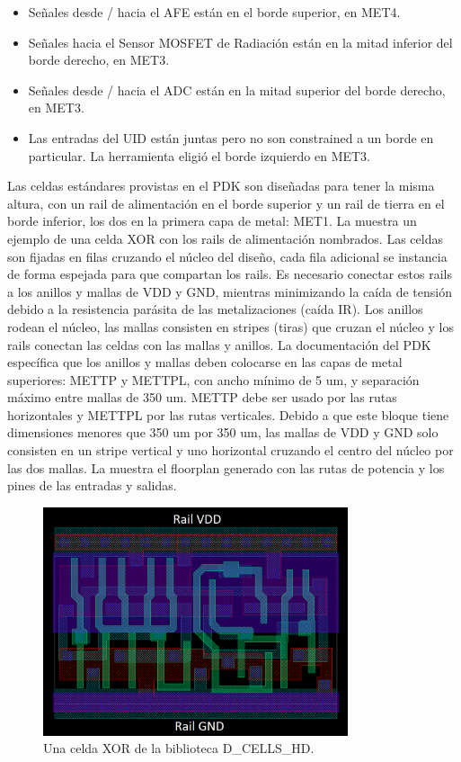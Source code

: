 \documentclass[a4paper, twoside, 11pt]{report}
\begin{document}
\begin{itemize}
  \item Señales desde / hacia el AFE están en el borde superior, en MET4.
  \item Señales hacia el Sensor MOSFET de Radiación están en la mitad inferior del borde derecho, en MET3.
  \item Señales desde / hacia el ADC están en la mitad superior del borde derecho, en MET3.
  \item Las entradas del UID están juntas pero no son constrained a un borde en particular. La herramienta eligió el borde izquierdo en MET3.
\end{itemize}

Las celdas estándares provistas en el PDK son diseñadas para tener la misma altura, con un rail de alimentación en el borde superior y un rail de tierra en el borde inferior, los dos en la primera capa de metal: MET1. La  muestra un ejemplo de una celda XOR con los rails de alimentación nombrados. Las celdas son fijadas en filas cruzando el núcleo del diseño, cada fila adicional se instancia de forma espejada para que compartan los rails. Es necesario conectar estos rails a los anillos y mallas de VDD y GND, mientras minimizando la caída de tensión debido a la resistencia parásita de las metalizaciones (caída IR). Los anillos rodean el núcleo, las mallas consisten en stripes (tiras) que cruzan el núcleo y los rails conectan las celdas con las mallas y anillos. La documentación del PDK~\cite{dig_imp_guidelines} específica que los anillos y mallas deben colocarse en las capas de metal superiores: METTP y METTPL, con ancho mínimo de 5 um, y separación máximo entre mallas de 350 um. METTP debe ser usado por las rutas horizontales y METTPL por las rutas verticales. Debido a que este bloque tiene dimensiones menores que 350 um por 350 um, las mallas de VDD y GND solo consisten en un stripe vertical y uno horizontal cruzando el centro del núcleo por las dos mallas. La  muestra el floorplan generado con las rutas de potencia y los pines de las entradas y salidas.

\begin{figure}[htb]
  \centering
  \includegraphics[width=0.8\textwidth]{./img/xor_cell}
  \caption{Una celda XOR de la biblioteca D\_CELLS\_HD.}
  \label{fig:xor_cell}
\end{figure}
\end{document}
